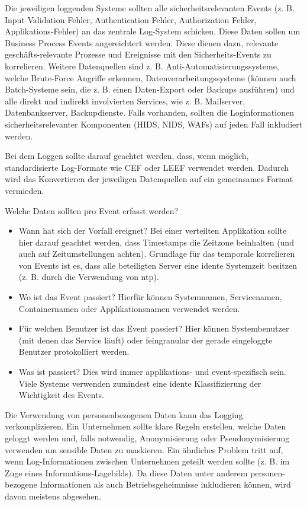 Die jeweiligen loggenden Systeme sollten alle sicherheitsrelevanten Events (z. B. Input Validation Fehler, Authentication Fehler, Authorization Fehler, Applikations-Fehler) an das zentrale Log-System schicken. Diese Daten sollen um Business Process Events angereichtert werden. Diese dienen dazu, relevante geschäfts-relevante Prozesse und Ereignisse mit den Sicherheits-Events zu korrelieren. Weitere Datenquellen sind z. B. Anti-Automatisierungssysteme, welche Brute-Force Angriffe erkennen, Datenverarbeitungssysteme (können auch Batch-Systeme sein, die z. B. einen Daten-Export oder Backups ausführen) und alle direkt und indirekt involvierten Services, wie z. B. Mailserver, Datenbankserver, Backupdienste. Falls vorhanden, sollten die Loginformationen sicherheitsrelevanter Komponenten (HIDS, NIDS, WAFs) auf jeden Fall inkludiert werden.

Bei dem Loggen sollte darauf geachtet werden, dass, wenn möglich, standardisierte Log-Formate wie CEF oder LEEF verwendet werden. Dadurch wird das Konvertieren der jeweiligen Datenquellen auf ein gemeinsames Format vermieden.

Welche Daten sollten pro Event erfasst werden?

\begin{itemize}
	\item Wann hat sich der Vorfall ereignet? Bei einer verteilten Applikation sollte hier darauf geachtet werden, dass Timestamps die Zeitzone beinhalten (und auch auf Zeitumstellungen achten). Grundlage für das temporale korrelieren von Events ist es, dass alle beteiligten Server eine idente Systemzeit besitzen (z. B. durch die Verwendung von ntp).
	\item Wo ist das Event passiert? Hierfür können Systemnamen, Servicenamen, Containernamen oder Applikationsnamen verwendet werden.
	\item Für welchen Benutzer ist das Event passiert? Hier können Systembenutzer (mit denen das Service läuft) oder feingranular der gerade eingeloggte Benutzer protokolliert werden.
	\item Was ist passiert? Dies wird immer applikations- und event-spezifisch sein. Viele Systeme verwenden zumindest eine idente Klassifizierung der Wichtigkeit des Events.
\end{itemize}

Die Verwendung von personenbezogenen Daten kann das Logging verkomplizieren. Ein Unternehmen sollte klare Regeln erstellen, welche Daten geloggt werden und, falls notwendig, Anonymisierung oder Pseudonymisierung verwenden um sensible Daten zu maskieren. Ein ähnliches Problem tritt auf, wenn Log-Informationen zwischen Unternehmen geteilt werden sollte (z. B. im Zuge eines Informations-Lagebilds). Da diese Daten unter anderem personen-bezogene Informationen als auch Betriebsgeheimnisse inkludieren können, wird davon meistens abgesehen.

